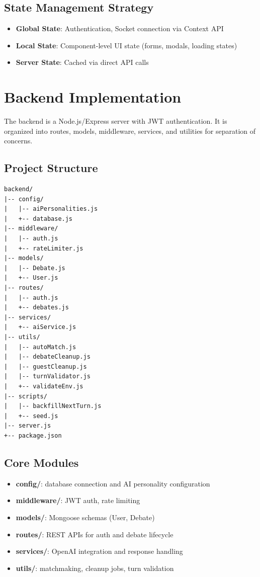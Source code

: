 \subsection{State Management Strategy}

\begin{itemize}
    \item \textbf{Global State}: Authentication, Socket connection via Context API
    \item \textbf{Local State}: Component-level UI state (forms, modals, loading states)
    \item \textbf{Server State}: Cached via direct API calls
\end{itemize}

\section{Backend Implementation}

The backend is a Node.js/Express server with JWT authentication. It is organized into routes,
models, middleware, services, and utilities for separation of concerns.

\subsection{Project Structure}
\begin{verbatim}
backend/
|-- config/
|   |-- aiPersonalities.js
|   +-- database.js
|-- middleware/
|   |-- auth.js
|   +-- rateLimiter.js
|-- models/
|   |-- Debate.js
|   +-- User.js
|-- routes/
|   |-- auth.js
|   +-- debates.js
|-- services/
|   +-- aiService.js
|-- utils/
|   |-- autoMatch.js
|   |-- debateCleanup.js
|   |-- guestCleanup.js
|   |-- turnValidator.js
|   +-- validateEnv.js
|-- scripts/
|   |-- backfillNextTurn.js
|   +-- seed.js
|-- server.js
+-- package.json
\end{verbatim}

\subsection{Core Modules}
\begin{itemize}
    \item \textbf{config/}: database connection and AI personality configuration
    \item \textbf{middleware/}: JWT auth, rate limiting
    \item \textbf{models/}: Mongoose schemas (User, Debate)
    \item \textbf{routes/}: REST APIs for auth and debate lifecycle
    \item \textbf{services/}: OpenAI integration and response handling
    \item \textbf{utils/}: matchmaking, cleanup jobs, turn validation
\end{itemize}


